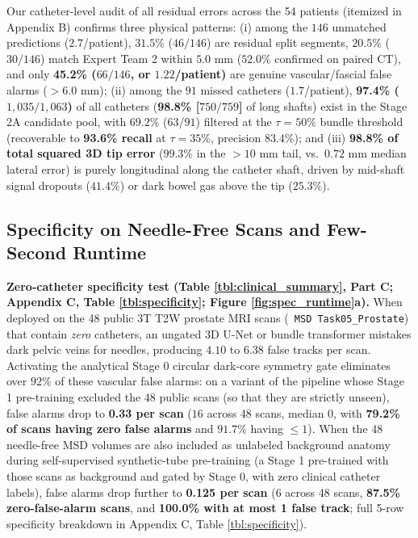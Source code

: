\documentclass[
  11pt,
]{article}
\let\nforigtexttt\texttt
\renewcommand{\texttt}[1]{\nforigtexttt{\XeTeXinterchartokenstate=1 #1}}
\begin{document}
Our catheter-level audit of all residual errors across the 54 patients
(itemized in Appendix B) confirms three physical patterns: (i) among the
\(146\) unmatched predictions (\(2.7\)/patient), \(31.5\%\) (\(46/146\))
are residual split segments, \(20.5\%\) (\(30/146\)) match Expert Team 2
within \(5.0\text{ mm}\) (\(52.0\%\) confirmed on paired CT), and only
\textbf{45.2\% (\(66/146\), or \(1.22\)/patient)} are genuine
vascular/fascial false alarms (\(>6.0\text{ mm}\)); (ii) among the
\(91\) missed catheters (\(1.7\)/patient), \textbf{97.4\%
(\(1,035/1,063\))} of all catheters (\textbf{98.8\% {[}\(750/759\){]}}
of long shafts) exist in the Stage 2A candidate pool, with \(69.2\%\)
(\(63/91\)) filtered at the \(\tau = 50\%\) bundle threshold
(recoverable to \textbf{93.6\% recall} at \(\tau = 35\%\), precision
\(83.4\%\)); and (iii) \textbf{98.8\% of total squared 3D tip error}
(\(99.3\%\) in the \(>10\text{ mm}\) tail, vs.~\(0.72\text{ mm}\) median
lateral error) is purely longitudinal along the catheter shaft, driven
by mid-shaft signal dropouts (\(41.4\%\)) or dark bowel gas above the
tip (\(25.3\%\)).

\FloatBarrier

\subsection{Specificity on Needle-Free Scans and Few-Second
Runtime}\label{specificity-on-needle-free-scans-and-few-second-runtime}

\textbf{Zero-catheter specificity test (Table
\ref{tbl:clinical_summary}, Part C; Appendix C, Table
\ref{tbl:specificity}; Figure \ref{fig:spec_runtime}a).} When deployed
on the 48 public 3T T2W prostate MRI scans
(\texttt{MSD\ Task05\_Prostate}) that contain \emph{zero} catheters, an
ungated 3D U-Net or bundle transformer mistakes dark pelvic veins for
needles, producing \(4.10\text{ to }6.38\) false tracks per scan.
Activating the analytical Stage 0 circular dark-core symmetry gate
eliminates over \(92\%\) of these vascular false alarms: on a variant of
the pipeline whose Stage 1 pre-training excluded the 48 public scans (so
that they are strictly unseen), false alarms drop to \textbf{0.33 per
scan} (\(16\) across 48 scans, median \(0\), with \textbf{79.2\% of
scans having zero false alarms} and \(91.7\%\) having \(\le 1\)). When
the 48 needle-free MSD volumes are also included as unlabeled background
anatomy during self-supervised synthetic-tube pre-training (a Stage 1
pre-trained with those scans as background and gated by Stage 0, with
zero clinical catheter labels), false alarms drop further to
\textbf{0.125 per scan} (\(6\) across 48 scans, \textbf{87.5\%
zero-false-alarm scans}, and \textbf{100.0\% with at most 1 false
track}; full 5-row specificity breakdown in Appendix C, Table
\ref{tbl:specificity}).
\end{document}
